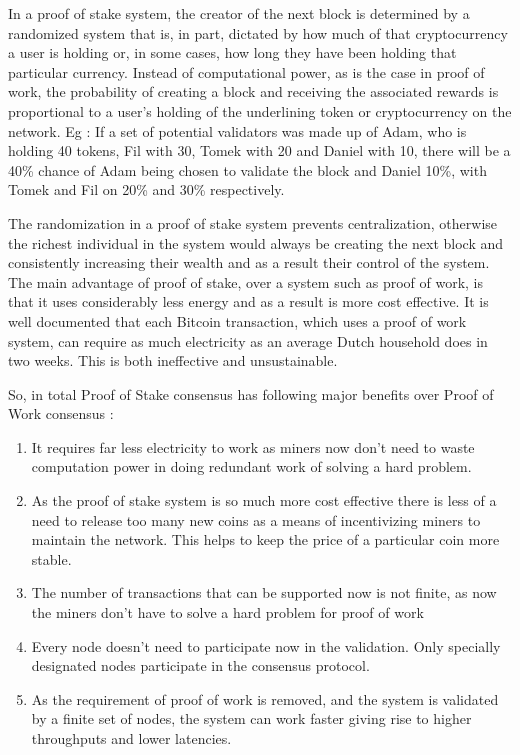 In a proof of stake system, the creator of the next block is determined by a randomized system that is, in part, dictated by how much of that cryptocurrency a user is holding or, in some cases, how long they have been holding that particular currency. Instead of computational power, as is the case in proof of work, the probability of creating a block and receiving the associated rewards is proportional to a user’s holding of the underlining token or cryptocurrency on the network. Eg : If a set of potential validators was made up of Adam, who is holding 40 tokens, Fil with 30, Tomek with 20 and Daniel with 10, there will be a 40\% chance of Adam being chosen to validate the block and Daniel 10\%, with Tomek and Fil on 20\% and 30\% respectively.

The randomization in a proof of stake system prevents centralization, otherwise the richest individual in the system would always be creating the next block and consistently increasing their wealth and as a result their control of the system. The main advantage of proof of stake, over a system such as proof of work, is that it uses considerably less energy and as a result is more cost effective. It is well documented that each Bitcoin transaction, which uses a proof of work system, can require as much electricity as an average Dutch household does in two weeks. This is both ineffective and unsustainable.

So, in total Proof of Stake consensus has following major benefits over Proof of Work consensus :

\begin{enumerate}
    \item It requires far less electricity to work as miners now don't need to waste computation power in doing redundant work of solving a hard problem.
    \item As the proof of stake system is so much more cost effective there is less of a need to release too many new coins as a means of incentivizing miners to maintain the network. This helps to keep the price of a particular coin more stable.
    \item The number of transactions that can be supported now is not finite, as now the miners don't have to solve a hard problem for proof of work
    \item Every node doesn't need to participate now in the validation. Only specially designated nodes participate in the consensus protocol.
    \item As the requirement of proof of work is removed, and the system is validated by a finite set of nodes, the system can work faster giving rise to higher throughputs and lower latencies. 
\end{enumerate}

